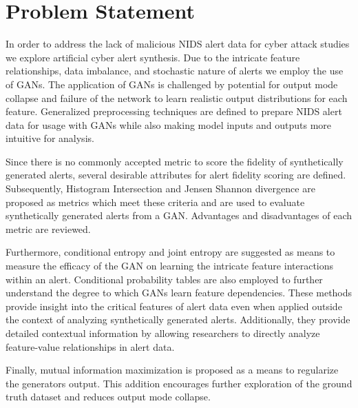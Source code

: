 \section{Problem Statement}

In order to address the lack of malicious NIDS alert data for cyber attack studies we explore artificial cyber alert synthesis. Due to the intricate feature relationships, data imbalance, and stochastic nature of alerts we employ the use of GANs. The application of GANs is challenged by potential for output mode collapse and failure of the network to learn realistic output distributions for each feature. Generalized preprocessing techniques are defined to prepare NIDS alert data for usage with GANs while also making model inputs and outputs more intuitive for analysis. 

Since there is no commonly accepted metric to score the fidelity of synthetically generated alerts, several desirable attributes for alert fidelity scoring are defined. Subsequently, Histogram Intersection and Jensen Shannon divergence are proposed as metrics which meet these criteria and are used to evaluate synthetically generated alerts from a GAN. Advantages and disadvantages of each metric are reviewed. 

Furthermore, conditional entropy and joint entropy are suggested as means to measure the efficacy of the GAN on learning the intricate feature interactions within an alert. Conditional probability tables are also employed to further understand the degree to which GANs learn feature dependencies. These methods provide insight into the critical features of alert data even when applied outside the context of analyzing synthetically generated alerts. Additionally, they provide detailed contextual information by allowing researchers to directly analyze feature-value relationships in alert data. 

Finally, mutual information maximization is proposed as a means to regularize the generators output. This addition encourages further exploration of the ground truth dataset and reduces output mode collapse.  


